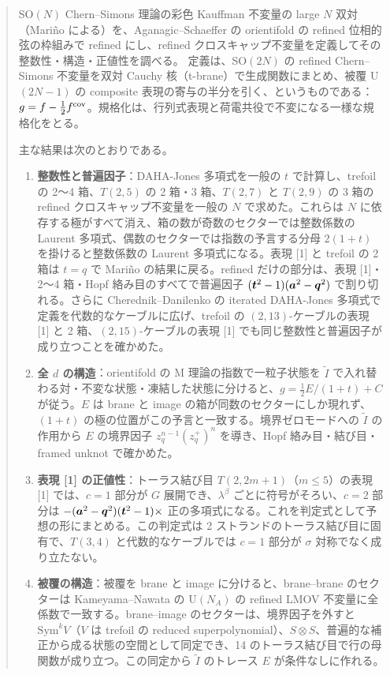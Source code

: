 \begin{abstract}
SO$(N)$ Chern--Simons 理論の彩色 Kauffman 不変量の large $N$ 双対（Mariño による）を、Aganagic--Schaeffer の orientifold の refined 位相的弦の枠組みで refined にし、refined クロスキャップ不変量を定義してその整数性・構造・正値性を調べる。
定義は、SO$(2N)$ の refined Chern--Simons 不変量を双対 Cauchy 核（t-brane）で生成関数にまとめ、被覆 U$(2N-1)$ の composite 表現の寄与の半分を引く、というものである：$g = f - \tfrac12 f^{\cov}$。規格化は、行列式表現と荷電共役で不変になる一様な規格化をとる。

主な結果は次のとおりである。
\begin{enumerate}
\item \textbf{整数性と普遍因子}：DAHA-Jones 多項式を一般の $t$ で計算し、trefoil の 2〜4 箱、$T(2,5)$ の 2 箱・3 箱、$T(2,7)$ と $T(2,9)$ の 3 箱の refined クロスキャップ不変量を一般の $N$ で求めた。これらは $N$ に依存する極がすべて消え、箱の数が奇数のセクターでは整数係数の Laurent 多項式、偶数のセクターでは指数の予言する分母 $2(1+t)$ を掛けると整数係数の Laurent 多項式になる。表現 [1] と trefoil の 2 箱は $t = q$ で Mariño の結果に戻る。refined だけの部分は、表現 [1]・2〜4 箱・Hopf 絡み目のすべてで普遍因子 $(\bt^2 - 1)(\ba^2 - \bq^2)$ で割り切れる。さらに Cherednik--Danilenko の iterated DAHA-Jones 多項式で定義を代数的なケーブルに広げ、trefoil の $(2,13)$-ケーブルの表現 [1] と 2 箱、$(2,15)$-ケーブルの表現 [1] でも同じ整数性と普遍因子が成り立つことを確かめた。
\item \textbf{全 $d$ の構造}：orientifold の M 理論の指数で一粒子状態を $\tilde I$ で入れ替わる対・不変な状態・凍結した状態に分けると、$g = \tfrac12 E/(1+t) + C$ が従う。$E$ は brane と image の箱が同数のセクターにしか現れず、$(1+t)$ の極の位置がこの予言と一致する。境界ゼロモードへの $\tilde I$ の作用から $E$ の境界因子 $z_q^{n-1}(z_q^+)^n$ を導き、Hopf 絡み目・結び目・framed unknot で確かめた。
\item \textbf{表現 [1] の正値性}：トーラス結び目 $T(2,2m+1)$（$m \le 5$）の表現 [1] では、$c = 1$ 部分が $G$ 展開でき、$\lambda^\beta$ ごとに符号がそろい、$c = 2$ 部分は $-(\ba^2 - \bq^2)(\bt^2 - 1)\times$ 正の多項式になる。これを判定式として予想の形にまとめる。この判定式は 2 ストランドのトーラス結び目に固有で、$T(3,4)$ と代数的なケーブルでは $c = 1$ 部分が $\sigma$ 対称でなく成り立たない。
\item \textbf{被覆の構造}：被覆を brane と image に分けると、brane--brane のセクターは Kameyama--Nawata の U$(N_A)$ の refined LMOV 不変量に全係数で一致する。brane--image のセクターは、境界因子を外すと $\mathrm{Sym}^k V$（$V$ は trefoil の reduced superpolynomial）、$S \otimes S$、普遍的な補正から成る状態の空間として同定でき、14 のトーラス結び目で行の母関数が成り立つ。この同定から $\tilde I$ のトレース $E$ が条件なしに作れる。

\end{enumerate}
\end{abstract}

